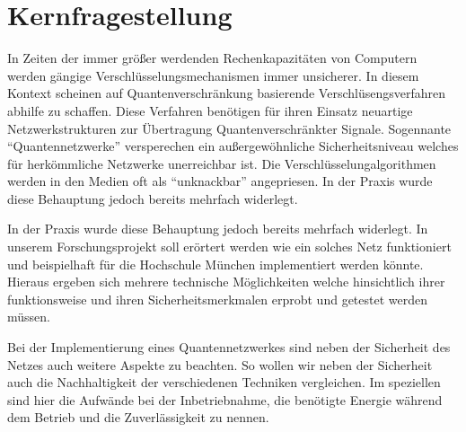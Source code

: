 \chapter{Kernfragestellung}

In Zeiten der immer größer werdenden Rechenkapazitäten von Computern 
werden gängige Verschlüsselungsmechanismen immer unsicherer. In diesem 
Kontext scheinen auf Quantenverschränkung basierende Verschlüsengsverfahren
abhilfe zu schaffen. Diese Verfahren benötigen für ihren Einsatz neuartige 
Netzwerkstrukturen zur Übertragung Quantenverschränkter Signale. 
Sogennante “Quantennetzwerke” versperechen ein außergewöhnliche 
Sicherheitsniveau welches für herkömmliche Netzwerke unerreichbar ist.
Die Verschlüsselungalgorithmen werden in den Medien oft als “unknackbar” 
angepriesen. In der Praxis wurde diese Behauptung jedoch bereits mehrfach widerlegt.

In der Praxis wurde diese Behauptung jedoch bereits mehrfach widerlegt.
In unserem Forschungsprojekt soll erörtert werden wie ein solches Netz funktioniert und beispielhaft für die Hochschule München implementiert werden könnte.
Hieraus ergeben sich mehrere technische Möglichkeiten welche hinsichtlich ihrer funktionsweise und ihren Sicherheitsmerkmalen erprobt und getestet werden müssen.

Bei der Implementierung eines Quantennetzwerkes sind neben der Sicherheit des Netzes auch weitere Aspekte zu beachten.
So wollen wir neben der Sicherheit auch die Nachhaltigkeit der verschiedenen Techniken vergleichen.
Im speziellen sind hier die Aufwände bei der Inbetriebnahme, die benötigte Energie während dem Betrieb und die Zuverlässigkeit zu nennen.
